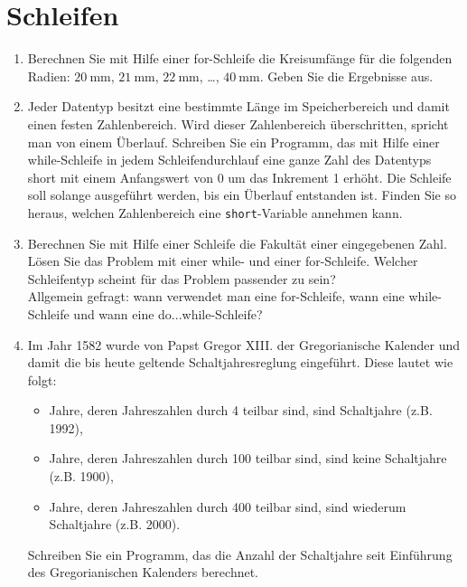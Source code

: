 \documentclass[paper=a4, fontsize=11pt, twoside]{scrartcl}
\begin{document}
\section*{Schleifen}
\begin{enumerate}[resume]
  \item Berechnen Sie mit Hilfe einer for-Schleife die Kreisumfänge für die folgenden Radien: $\SI{20}{\mm}$, $\SI{21}{\mm}$, $\SI{22}{\mm}$, \dots, $\SI{40}{\mm}$. Geben Sie die Ergebnisse aus.
  \item Jeder Datentyp besitzt eine bestimmte Länge im Speicherbereich und damit einen festen Zahlenbereich. Wird dieser Zahlenbereich überschritten, spricht man von einem Überlauf. Schreiben Sie ein Programm, das mit Hilfe einer while-Schleife in jedem Schleifendurchlauf eine ganze Zahl des Datentyps short mit einem Anfangswert von 0 um das Inkrement 1 erhöht. Die Schleife soll solange ausgeführt werden, bis ein Überlauf entstanden ist. Finden Sie so heraus, welchen Zahlenbereich eine \texttt{short}-Variable annehmen kann.
  \item Berechnen Sie mit Hilfe einer Schleife die Fakultät einer eingegebenen Zahl. Lösen Sie das Problem mit einer while- und einer for-Schleife. Welcher Schleifentyp scheint für das Problem passender zu sein?\\
  Allgemein gefragt: wann verwendet man eine for-Schleife, wann eine while-Schleife und wann eine do...while-Schleife?
 \item Im Jahr 1582 wurde von  Papst Gregor XIII. der Gregorianische Kalender und damit die bis heute geltende Schaltjahresreglung eingeführt. Diese lautet wie folgt:
   \begin{itemize}
   \item Jahre, deren Jahreszahlen durch 4 teilbar sind, sind Schaltjahre (z.B. 1992), 
   \item Jahre, deren Jahreszahlen durch 100 teilbar sind, sind keine Schaltjahre (z.B. 1900), 
   \item Jahre, deren Jahreszahlen durch 400 teilbar sind, sind wiederum Schaltjahre (z.B. 2000).
   \end{itemize}
   Schreiben Sie ein Programm, das die Anzahl der Schaltjahre seit Einführung des Gregorianischen Kalenders berechnet.
\end{enumerate}
\end{document}
